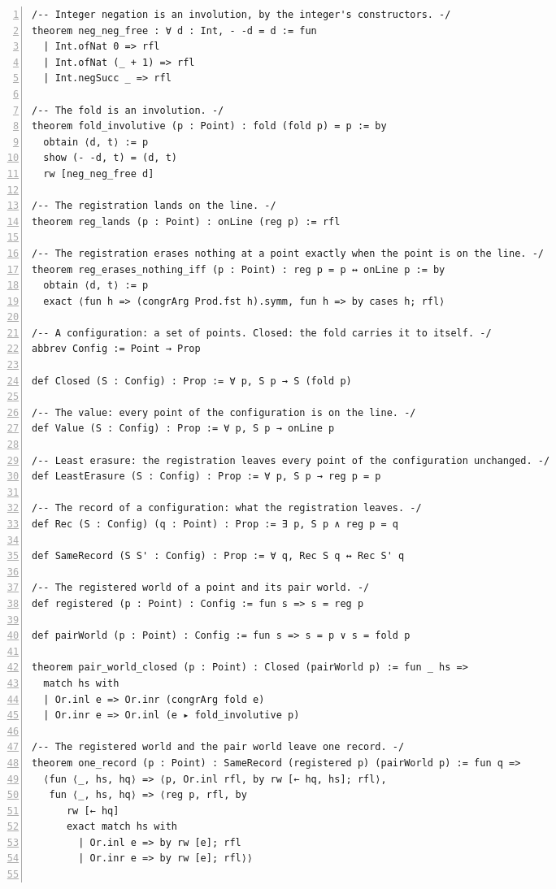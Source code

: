 \documentclass[10pt]{article}
\newcommand{\leansize}{\fontsize{5.5pt}{6.75pt}\selectfont}
\begin{document}
\begin{multicols}{2}
\begin{Verbatim}[numbers=left,firstnumber=1,numbersep=3pt,xleftmargin=2.6em,breaklines=true,breakanywhere=true,breakautoindent=false,breakindent=1.4em,breaksymbolleft={},breakanywheresymbolpre={},fontsize=\leansize]
/-- Integer negation is an involution, by the integer's constructors. -/
theorem neg_neg_free : ∀ d : Int, - -d = d := fun
  | Int.ofNat 0 => rfl
  | Int.ofNat (_ + 1) => rfl
  | Int.negSucc _ => rfl

/-- The fold is an involution. -/
theorem fold_involutive (p : Point) : fold (fold p) = p := by
  obtain ⟨d, t⟩ := p
  show (- -d, t) = (d, t)
  rw [neg_neg_free d]

/-- The registration lands on the line. -/
theorem reg_lands (p : Point) : onLine (reg p) := rfl

/-- The registration erases nothing at a point exactly when the point is on the line. -/
theorem reg_erases_nothing_iff (p : Point) : reg p = p ↔ onLine p := by
  obtain ⟨d, t⟩ := p
  exact ⟨fun h => (congrArg Prod.fst h).symm, fun h => by cases h; rfl⟩

/-- A configuration: a set of points. Closed: the fold carries it to itself. -/
abbrev Config := Point → Prop

def Closed (S : Config) : Prop := ∀ p, S p → S (fold p)

/-- The value: every point of the configuration is on the line. -/
def Value (S : Config) : Prop := ∀ p, S p → onLine p

/-- Least erasure: the registration leaves every point of the configuration unchanged. -/
def LeastErasure (S : Config) : Prop := ∀ p, S p → reg p = p

/-- The record of a configuration: what the registration leaves. -/
def Rec (S : Config) (q : Point) : Prop := ∃ p, S p ∧ reg p = q

def SameRecord (S S' : Config) : Prop := ∀ q, Rec S q ↔ Rec S' q

/-- The registered world of a point and its pair world. -/
def registered (p : Point) : Config := fun s => s = reg p

def pairWorld (p : Point) : Config := fun s => s = p ∨ s = fold p

theorem pair_world_closed (p : Point) : Closed (pairWorld p) := fun _ hs =>
  match hs with
  | Or.inl e => Or.inr (congrArg fold e)
  | Or.inr e => Or.inl (e ▸ fold_involutive p)

/-- The registered world and the pair world leave one record. -/
theorem one_record (p : Point) : SameRecord (registered p) (pairWorld p) := fun q =>
  ⟨fun ⟨_, hs, hq⟩ => ⟨p, Or.inl rfl, by rw [← hq, hs]; rfl⟩,
   fun ⟨_, hs, hq⟩ => ⟨reg p, rfl, by
      rw [← hq]
      exact match hs with
        | Or.inl e => by rw [e]; rfl
        | Or.inr e => by rw [e]; rfl⟩⟩


\end{Verbatim}
\end{multicols}
\end{document}

